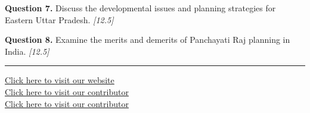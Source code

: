 \documentclass[11pt,a4paper]{article}
\newcommand{\pts}[1]{\hfill   \textit{[#1]}}
\begin{document}
\medskip


\noindent   \textbf{Question 7.} Discuss the developmental issues and planning strategies for Eastern Uttar Pradesh. \pts{12.5}

\medskip


\noindent   \textbf{Question 8.} Examine the merits and demerits of Panchayati Raj planning in India. \pts{12.5}

\vfill\rule{\linewidth}{0.4pt}

\begin{center}\small
\href{https://bhu-exam.vercel.app/}{Click here to visit our website}\\[4pt]
\href{https://me-aryan.vercel.app/}{Click here to visit our contributor}\\[4pt]
\href{https://quashan-me.vercel.app/}{Click here to visit our contributor}
\end{center}
\end{document}
